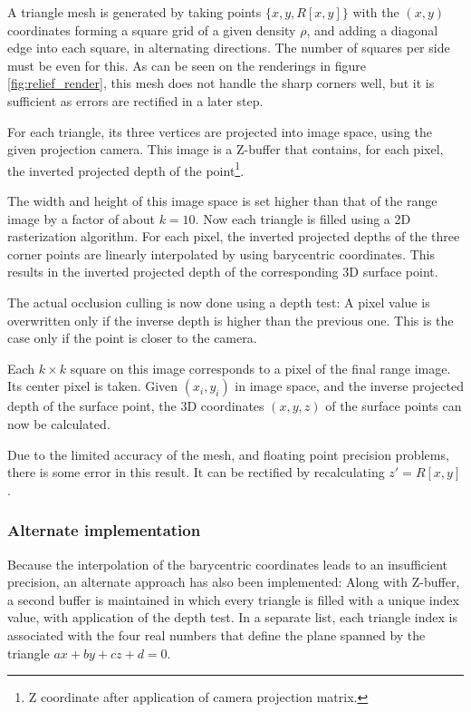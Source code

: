 A triangle mesh is generated by taking points $\{ x, y, R[x,y] \}$ with the $(x,y)$ coordinates forming a square grid of a given density $\rho$, and adding a diagonal edge into each square, in alternating directions. The number of squares per side must be even for this. As can be seen on the renderings in figure \ref{fig:relief_render}, this mesh does not handle the sharp corners well, but it is sufficient as errors are rectified in a later step.

For each triangle, its three vertices are projected into image space, using the given projection camera. This image is a Z-buffer that contains, for each pixel, the inverted projected depth of the point\footnote{Z coordinate after application of camera projection matrix.}.

The width and height of this image space is set higher than that of the range image by a factor of about $k = 10$. Now each triangle is filled using a 2D rasterization algorithm. For each pixel, the inverted projected depths of the three corner points are linearly interpolated by using barycentric coordinates. This results in the inverted projected depth of the corresponding 3D surface point.

The actual occlusion culling is now done using a depth test: A pixel value is overwritten only if the inverse depth is higher than the previous one. This is the case only if the point is closer to the camera.

Each $k \times k$ square on this image corresponds to a pixel of the final range image. Its center pixel is taken. Given $(x_i, y_i)$ in image space, and the inverse projected depth of the surface point, the 3D coordinates $(x, y, z)$ of the surface points can now be calculated.

Due to the limited accuracy of the mesh, and floating point precision problems, there is some error in this result. It can be rectified by recalculating $z' = R[x, y]$.

\subsubsection{Alternate implementation}
Because the interpolation of the barycentric coordinates leads to an insufficient precision, an alternate approach has also been implemented: Along with Z-buffer, a second buffer is maintained in which every triangle is filled with a unique index value, with application of the depth test. In a separate list, each triangle index is associated with the four real numbers that define the plane spanned by the triangle $a x + b y + c z + d = 0$.

